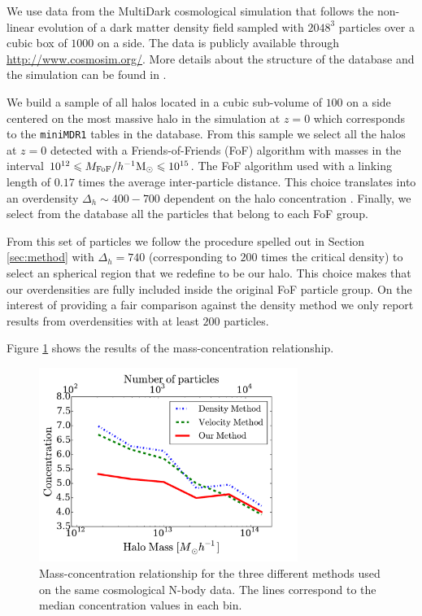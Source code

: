 \documentclass[a4,useAMS,usenatbib,usegraphicx]{mn2e}
\newcommand{\hMpc}{{\ifmmode{h^{-1}{\rm Mpc}}\else{$h^{-1}$Mpc}\fi}}
\newcommand{\hMsun}{{\ifmmode{h^{-1}{\rm {M_{\odot}}}}\else{$h^{-1}{\rm{M_{\odot}}}$}\fi}}
\begin{document}
We use data from the MultiDark cosmological simulation that follows
the non-linear evolution of a dark matter density field sampled with
$2048^3$ particles over a cubic box of $1000$ \hMpc on a side. 
The data is publicly available through \url{http://www.cosmosim.org/}.
More details about the structure of the database and the simulation
can be found in \citep{2013AN....334..691R}.

We build a sample of all halos located in a cubic sub-volume of $100$
\hMpc on a side centered on the most massive halo in the simulation at
$z=0$ which corresponds to the \texttt{miniMDR1} tables in the
database.
From this sample we select all the halos at $z=0$ detected with a
Friends-of-Friends (FoF) algorithm with masses in the interval
$10^{12}\leq M_{\rm FoF}/\hMsun \leq 10^{15}$.
The FoF algorithm used with a linking length of $0.17$ times the average
inter-particle distance. This choice translates into an overdensity
$\Delta_h\sim 400-700$ dependent on the halo concentration
\citep{More2011}.
Finally, we select from the database all the particles that belong to
each FoF group.

From this set of particles we follow the procedure spelled out in
Section \ref{sec:method} with $\Delta_h=740$  (corresponding to $200$
times the critical density) to select an spherical region that we
redefine to be our halo.
This choice makes that our overdensities are fully included inside the
original FoF particle group.
On the interest of providing a fair comparison against the density
method we only report results from overdensities with at least $200$
particles. 

Figure \ref{fig:concentration} shows the results of the
mass-concentration relationship.

\begin{figure}
\begin{center}
  \includegraphics[width=0.75\textwidth]{concentration.pdf}
\end{center}
\caption{Mass-concentration relationship for the three different
  methods used on the same cosmological N-body data. 
  The lines correspond to the median concentration values in each bin.
    \label{fig:concentration}}
\end{figure}
\end{document}
